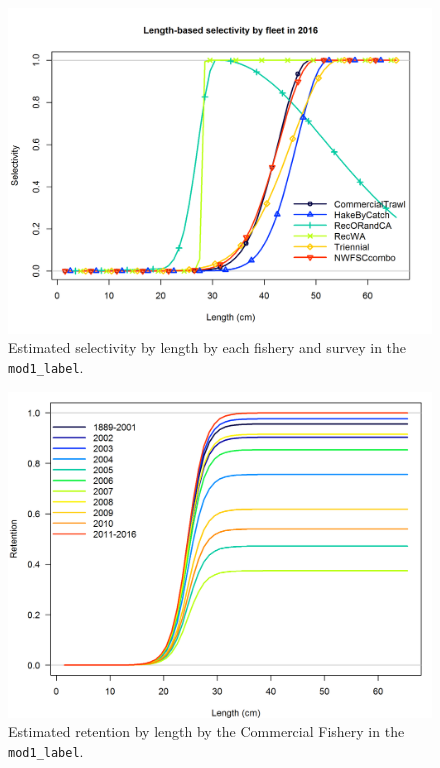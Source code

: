 \documentclass[12pt,]{article}
\begin{document}
\FloatBarrier 

\begin{figure}[htbp]
\centering
\includegraphics{r4ss/plots_mod1/sel01_multiple_fleets_length1.png}
\caption{Estimated selectivity by length by each fishery and survey in
the \texttt{mod1\_label}. \label{fig:selex}}
\end{figure}

\begin{figure}[htbp]
\centering
\includegraphics{r4ss/plots_mod1/time-varying_retention.png}
\caption{Estimated retention by length by the Commercial Fishery in the
\texttt{mod1\_label}. \label{fig:retention}}
\end{figure}
\end{document}
